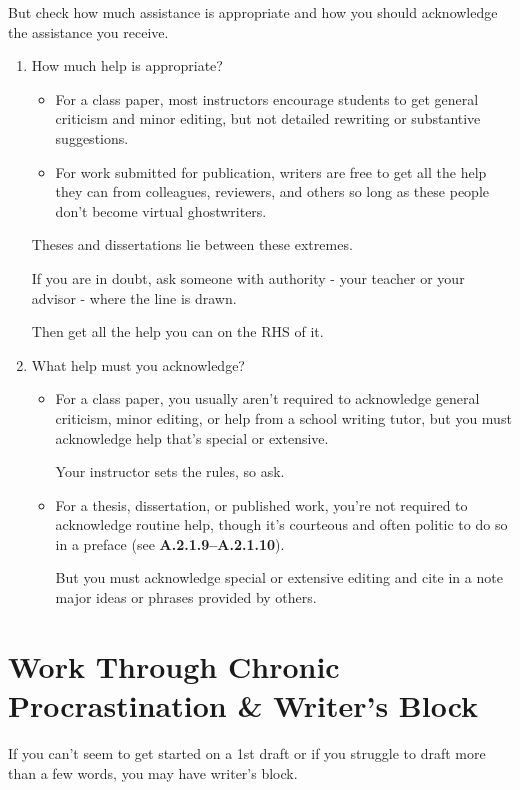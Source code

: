 \documentclass[oneside]{book}
\numberwithin{equation}{section}
\begin{document}
But check how much assistance is appropriate and how you should acknowledge the assistance you receive.
\begin{enumerate}
    \item How much help is appropriate?
    \begin{itemize}
        \item For a class paper, most instructors encourage students to get general criticism and minor editing, but not detailed rewriting or substantive suggestions.
        \item For work submitted for publication, writers are free to get all the help they can from colleagues, reviewers, and others so long as these people don't become virtual ghostwriters.        
    \end{itemize}
    Theses and dissertations lie between these extremes.
    
    If you are in doubt, ask someone with authority - your teacher or your advisor - where the line is drawn.
    
    Then get all the help you can on the RHS of it.
    \item What help must you acknowledge?
    \begin{itemize}
        \item For a class paper, you usually aren't required to acknowledge general criticism, minor editing, or help from a school writing tutor, but you must acknowledge help that's special or extensive.
        
        Your instructor sets the rules, so ask.
        \item For a thesis, dissertation, or published work, you're not required to acknowledge routine help, though it's courteous and often politic to do so in a preface (see \textbf{A.2.1.9--A.2.1.10}).
        
        But you must acknowledge special or extensive editing and cite in a note major ideas or phrases provided by others.
    \end{itemize}
\end{enumerate}

\section{Work Through Chronic Procrastination \& Writer's Block}
If you can't seem to get started on a 1st draft or if you struggle to draft more than a few words, you may have writer's block.

\end{document}
